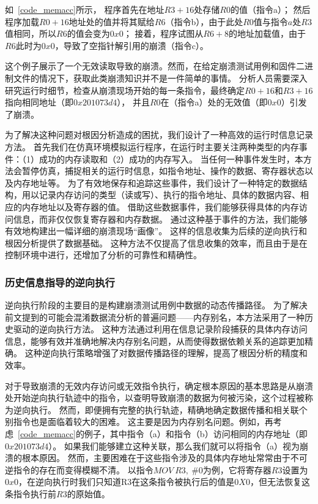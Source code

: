 如~\autoref{code_memacc}所示， 程序首先在地址$R3 + 16$处存储$R0$的值（指令a）；
然后程序加载$R0 + 16$地址处的值并将其赋给$R6$（指令b），由于此处$R0$值与指令$a$处$R3$值相同，所以$R6$的值会变为$0x0$；
接着，程序试图从$R6 + 8$的地址加载值，由于$R6$此时为$0x0$，导致了空指针解引用的崩溃（指令c）。

这个例子展示了一个无效读取导致的崩溃。然而，在给定崩溃测试用例和固件二进制文件的情况下，获取此类崩溃知识并不是一件简单的事情。
分析人员需要深入研究运行时细节，检查从崩溃现场开始的每一条指令，最终确定$R0 + 16$和$R3 + 16$指向相同地址（即$0x201073d4$），
并且$R0$在（指令a）处的无效值（即$0x0$）引发了崩溃。

为了解决这种问题对根因分析造成的困扰，我们设计了一种高效的运行时信息记录方法。
首先我们在仿真环境模拟运行程序，在运行时主要关注两种类型的内存事件：（1）成功的内存读取和（2）成功的内存写入。
当任何一种事件发生时，本方法会暂停仿真，捕捉相关的运行时信息，如指令地址、操作的数据、寄存器状态以及内存地址等。
为了有效地保存和追踪这些事件，我们设计了一种特定的数据结构，用以记录内存访问的类型（读或写）、执行的指令地址、具体的数据内容、相应的内存地址以及寄存器的值。
借助这些数据事件，我们能够获得具体的内存访问信息，而非仅仅恢复寄存器和内存数据。
通过这种基于事件的方法，我们能够有效地构建出一幅详细的崩溃现场“画像”。
这样的信息收集为后续的逆向执行和根因分析提供了数据基础。
这种方法不仅提高了信息收集的效率，而且由于是在控制环境中进行，还增加了分析的可靠性和精确性。
\subsubsection{历史信息指导的逆向执行}
逆向执行阶段的主要目的是构建崩溃测试用例中数据的动态传播路径。
为了解决前文提到的可能会混淆数据流分析的普遍问题——内存别名，本方法采用了一种历史驱动的逆向执行方法。
这种方法通过利用在信息记录阶段捕获的具体内存访问信息，能够有效并准确地解决内存别名问题，从而使得数据依赖关系的追踪更加精确。
这种逆向执行策略增强了对数据传播路径的理解，提高了根因分析的精度和效率。

对于导致崩溃的无效内存访问或无效指令执行，确定根本原因的基本思路是从崩溃处开始逆向执行轨迹中的指令，以查明导致崩溃的数据为何被污染，这个过程被称为逆向执行。
然而，即便拥有完整的执行轨迹，精确地确定数据传播和相关联个别指令也是面临着较大的困难。
这主要是因为内存别名问题。例如，再考虑~\autoref{code_memacc}的例子，其中指令（a）和指令（b）访问相同的内存地址（即$0x201073d4$）。
如果我们能够建立这种关联，那么我们就可以将指令（a）视为崩溃的根本原因。
然而，主要困难在于这些指令涉及的具体内存地址常常由于不可逆指令的存在而变得模糊不清。
以指令$MOV\ R3,\ \#0$为例，它将寄存器$R3$设置为$0x0$，在逆向执行时我们只知道R3在这条指令被执行后的值是$0X0$，但无法恢复这条指令执行前$R3$的原始值。


